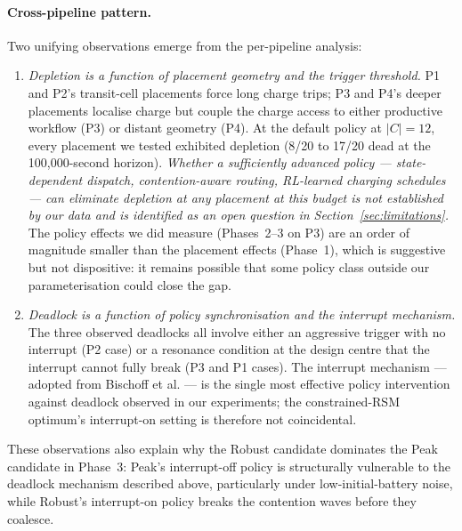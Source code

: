 \documentclass[conference]{IEEEtran}
\begin{document}
\paragraph{Cross-pipeline pattern.}
Two unifying observations emerge from the per-pipeline analysis:

\begin{enumerate}
  \item \emph{Depletion is a function of placement geometry and the trigger threshold.} P1 and P2's transit-cell placements force long charge trips; P3 and P4's deeper placements localise charge but couple the charge access to either productive workflow (P3) or distant geometry (P4). At the default policy at $|C|=12$, every placement we tested exhibited depletion (8/20 to 17/20 dead at the 100{,}000-second horizon). \emph{Whether a sufficiently advanced policy --- state-dependent dispatch, contention-aware routing, RL-learned charging schedules --- can eliminate depletion at any placement at this budget is not established by our data and is identified as an open question in Section~\ref{sec:limitations}.} The policy effects we did measure (Phases~2--3 on P3) are an order of magnitude smaller than the placement effects (Phase~1), which is suggestive but not dispositive: it remains possible that some policy class outside our parameterisation could close the gap.
  \item \emph{Deadlock is a function of policy synchronisation and the interrupt mechanism.} The three observed deadlocks all involve either an aggressive trigger with no interrupt (P2 case) or a resonance condition at the design centre that the interrupt cannot fully break (P3 and P1 cases). The interrupt mechanism --- adopted from Bischoff et al. \cite{bischoff2025} --- is the single most effective policy intervention against deadlock observed in our experiments; the constrained-RSM optimum's interrupt-on setting is therefore not coincidental.
\end{enumerate}

These observations also explain why the Robust candidate dominates the Peak candidate in Phase~3: Peak's interrupt-off policy is structurally vulnerable to the deadlock mechanism described above, particularly under low-initial-battery noise, while Robust's interrupt-on policy breaks the contention waves before they coalesce.
\end{document}
